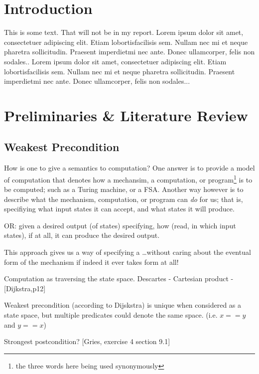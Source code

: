 \documentclass[oneside,12pt]{article}
\begin{document}
\pagebreak

\raggedbottom

\section{Introduction}


This is some text. That will not be in my report. Lorem  ipsum  dolor  sit  amet,  consectetuer  adipiscing  
elit.   Etiam  lobortisfacilisis sem.  Nullam nec mi et 
neque pharetra sollicitudin.  Praesent imperdietmi nec ante. 
Donec ullamcorper, felis non sodales.. Lorem  ipsum  dolor  sit  amet,  consectetuer  adipiscing  
elit.   Etiam  lobortisfacilisis sem.  Nullam nec mi et 
neque pharetra sollicitudin.  Praesent imperdietmi nec ante. 
Donec ullamcorper, felis non sodales...

\section{Preliminaries \& Literature Review}

\subsection{Weakest Precondition}

How is one to give a semantics to computation? One answer is to provide a model of computation that denotes how a mechansim, a computation, or program\footnote{ the three words here being used synonymously} is to be computed; such as a Turing machine, or a FSA. Another way however is to describe what the mechanism, computation, or program can \emph{do} for us; that is, specifiying what input states it can accept, and what states it will produce.


OR: given a desired output (of states) specifying, how (read, in which input states), if at all, it can produce the desired output.

This approach gives us a way of specifying a \ldots without caring about the eventual form of the mechanism if indeed it ever takes form at all!

Computation as traversing the state space. Descartes - Cartesian product - [Dijkstra,p12]


Weakest precondition (according to Dijskstra) is unique when considered as a state space, but multiple predicates could denote the same space. (i.e. $x == y$ and $y == x$)

Strongest postcondition?
[Gries, exercise 4 section 9.1]
\end{document}
